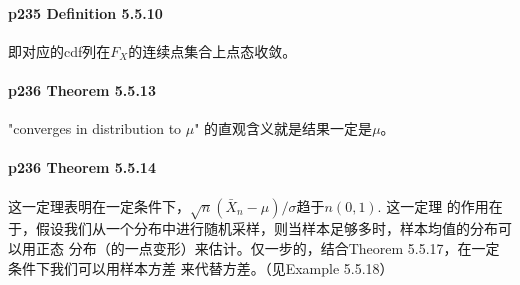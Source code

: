   \paragraph{p235 Definition 5.5.10}
    即对应的cdf列在$F_X$的连续点集合上点态收敛。

  \paragraph{p236 Theorem 5.5.13}
    "converges in distribution to $\mu$" 的直观含义就是结果一定是$\mu$。

  \paragraph{p236 Theorem 5.5.14}
    这一定理表明在一定条件下，$\sqrt{n}(\bar{X}_n-\mu)/\sigma$趋于$n(0, 1)$. 这一定理
    的作用在于，假设我们从一个分布中进行随机采样，则当样本足够多时，样本均值的分布可以用正态
    分布（的一点变形）来估计。仅一步的，结合Theorem 5.5.17，在一定条件下我们可以用样本方差
    来代替方差。（见Example 5.5.18）



